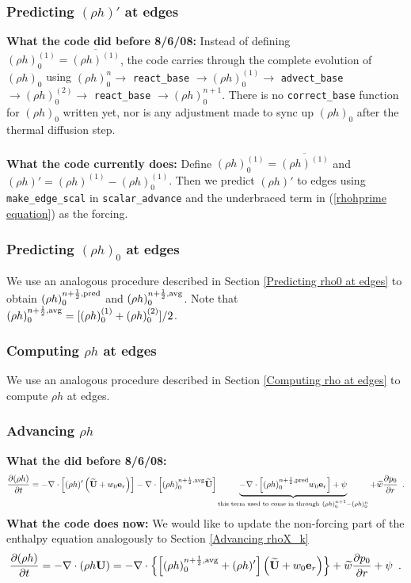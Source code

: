 \documentclass[11pt]{article}
\def\half  {\frac{1}{2}}
\def\eb    {{\bf e}}
\def\Ub    {{\bf U}}
\def\Ubt   {\widetilde{\bf U}}
\def\wt    {\widetilde{w}}
\begin{document}
\subsubsection{Predicting $(\rho h)'$ at edges}\label{Predicting rhohprime at edges}
{\bf What the code did before 8/6/08:}
 Instead of defining $(\rho h)_0^{(1)} = \overline{(\rho h)^{(1)}}$, the code carries 
through the complete evolution of $(\rho h)_0$ using $(\rho h)_0^n \rightarrow$ {\tt react\_base}
$\rightarrow (\rho h)_0^{(1)} \rightarrow$ {\tt advect\_base}
$\rightarrow (\rho h)_0^{(2)} \rightarrow$ {\tt react\_base} $\rightarrow (\rho h)_0^{n+1}$.  
There is no {\tt correct\_base} function for $(\rho h)_0$ written yet, nor is any adjustment made 
to sync up $(\rho h)_0$ after the thermal diffusion step.\\ \\
{\bf What the code currently does:}  Define $(\rho h)_0^{(1)} = \overline{(\rho h)^{(1)}}$  
and $(\rho h)' = (\rho h)^{(1)}-(\rho h)_0^{(1)}$.  Then we predict $(\rho h)'$ to 
edges using {\tt make\_edge\_scal} in {\tt scalar\_advance} and the underbraced term in 
(\ref{rhohprime equation}) as the forcing.
\subsubsection{Predicting $(\rho h)_0$ at edges}
We use an analogous procedure described in Section \ref{Predicting rho0 at edges} to 
obtain $(\rho h)_0^{n+\half,\rm{pred}}$ and $(\rho h)_0^{n+\half,\rm{avg}}$.  Note that 
$(\rho h)_0^{n+\half,{\rm avg}} = [(\rho h)_0^{(1)} + (\rho h)_0^{(2)}]/2$.
\subsubsection{Computing $\rho h$ at edges}
We use an analogous procedure described in Section \ref{Computing rho at edges} to compute
$\rho h$ at edges.
\subsubsection{Advancing $\rho h$}
{\bf What the did before 8/6/08:}
\begin{equation}
\frac{\partial(\rho h)}{\partial t} = -\nabla\cdot\left[(\rho h)'\left(\Ubt 
+ w_0\eb_r\right)\right] - \nabla\cdot\left[(\rho h)_0^{n+\half,{\rm avg}}\Ubt\right] 
\underbrace{- \nabla\cdot\left[(\rho h)_0^{n+\half,{\rm pred}}w_0\eb_r\right] + \psi}_{\text{this term used to come in through} ~ (\rho h)_0^{n+1} - (\rho h)_0^n} + \wt\frac{\partial p_0}{\partial r} \enskip .
\end{equation}
{\bf What the code does now:} We would like to update the 
non-forcing part of the enthalpy equation analogously to Section \ref{Advancing rhoX_k}
\begin{equation}
\frac{\partial(\rho h)}{\partial t} = -\nabla\cdot(\rho h\Ub) = 
-\nabla\cdot\left\{\left[(\rho h)_0^{n+\half,{\rm avg}} 
+ (\rho h)'\right]\left(\Ubt + w_0\eb_r\right)\right\} + \wt\frac{\partial p_0}{\partial r} + \psi  \enskip .
\end{equation}
\end{document}
